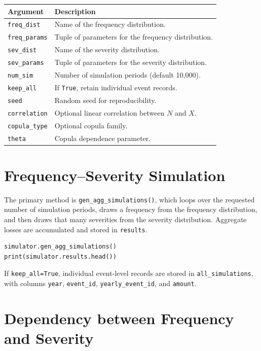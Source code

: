 \begin{center}
\begin{tabular}{ll}
\toprule
\textbf{Argument} & \textbf{Description} \\
\midrule
\texttt{freq\_dist}    & Name of the frequency distribution. \\
\texttt{freq\_params}  & Tuple of parameters for the frequency distribution. \\
\texttt{sev\_dist}     & Name of the severity distribution. \\
\texttt{sev\_params}   & Tuple of parameters for the severity distribution. \\
\texttt{num\_sim}      & Number of simulation periods (default 10{,}000). \\
\texttt{keep\_all}     & If \texttt{True}, retain individual event records. \\
\texttt{seed}          & Random seed for reproducibility. \\
\texttt{correlation}   & Optional linear correlation between $N$ and $X$. \\
\texttt{copula\_type}  & Optional copula family. \\
\texttt{theta}         & Copula dependence parameter. \\
\bottomrule
\end{tabular}
\end{center}

\section{Frequency--Severity Simulation}

The primary method is \texttt{gen\_agg\_simulations()}, which loops over
the requested number of simulation periods, draws a frequency from the
frequency distribution, and then draws that many severities from the
severity distribution. Aggregate losses are accumulated and stored in
\texttt{results}.

\begin{lstlisting}[style=pythonstyle]
simulator.gen_agg_simulations()
print(simulator.results.head())
\end{lstlisting}

If \texttt{keep\_all=True}, individual event-level records are stored in
\texttt{all\_simulations}, with columns \texttt{year}, \texttt{event\_id},
\texttt{yearly\_event\_id}, and \texttt{amount}.

\section{Dependency between Frequency and Severity}

